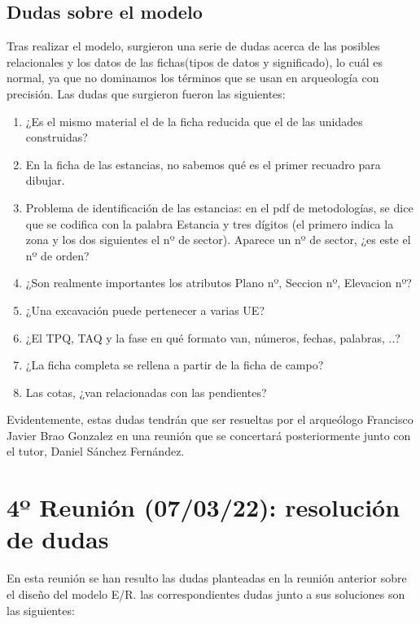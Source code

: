     \subsection{Dudas sobre el modelo} \label{subsec: doubts}
    Tras realizar el modelo, surgieron una serie de dudas acerca de las posibles relacionales
    y los datos de las fichas(tipos de datos y significado), lo cuál es normal, ya que no
    dominamos los términos que se usan en arqueología con precisión. Las dudas que surgieron
    fueron las siguientes:

        \begin{enumerate}
            \item ¿Es el mismo material el de la ficha reducida que el de las unidades
            construidas?
            \item En la ficha de las estancias, no sabemos qué es el primer recuadro para
            dibujar.
            \item Problema de identificación de las estancias: en el pdf de metodologías, 
            se dice que se codifica con la palabra Estancia y tres dígitos (el primero
            indica la zona y los dos siguientes el nº de sector). Aparece un nº de sector,
            ¿es este el nº de orden?
            \item ¿Son realmente importantes los atributos Plano nº, Seccion nº, Elevacion
            nº?
            \item ¿Una excavación puede pertenecer a varias UE?
            \item ¿El TPQ, TAQ y la fase en qué formato van, números, fechas, palabras, ..?
            \item ¿La ficha completa se rellena a partir de la ficha de campo?
            \item Las cotas, ¿van relacionadas con las pendientes?
        \end{enumerate}

    Evidentemente, estas dudas tendrán que ser resueltas por el arqueólogo Francisco Javier
    Brao Gonzalez en una reunión que se concertará posteriormente junto con el tutor,
    Daniel Sánchez Fernández.

\section{4º Reunión (07/03/22): resolución de dudas}
En esta reunión se han resulto las dudas planteadas en la reunión anterior sobre el diseño
del modelo E/R. las correspondientes dudas junto a sus soluciones son las siguientes:

